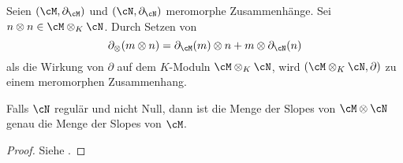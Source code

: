 \begin{prop} \label{prop:tensorZusammenhang}
Seien $(\cM,\partial_\cM)$ und $(\cN,\partial_\cN)$ meromorphe Zusammenhänge.
Sei $n\otimes n\in \cM\otimes_K\cN$.
Durch Setzen von
\begin{equation} \label{eq:TensorAbleiten}
\partial_\otimes(m\otimes n)=\partial_\cM(m)\otimes n +m\otimes \partial_\cN(n)
\end{equation}
als die Wirkung von $\partial$ auf dem $K$-Moduln $\cM\otimes_K\cN$, wird
$(\cM\otimes_K\cN,\partial)$ zu einem meromorphen Zusammenhang.
\begin{comment}
\cite[Prop 4.1.1]{SchneidersDmod}
\end{comment}
\end{prop}
\begin{comment}
TODO: Zeige universelle Eigenschaft
\end{comment}
\begin{comment}
\begin{proof}
Klar
\end{proof}
\end{comment}
\begin{lem} 
Falls $\cN$ regulär und nicht Null, dann ist die Menge der Slopes von
$\cM\otimes\cN$ genau die Menge der Slopes von $\cM$.
\end{lem}
\begin{proof}
Siehe \cite[Ex 5.3.7]{sabbah_cimpa90}.
\begin{comment}
TODO
\end{comment}
\end{proof}

